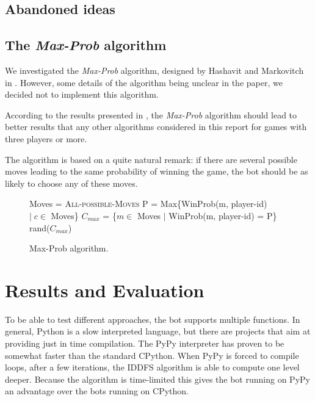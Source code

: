 \documentclass[a4paper,11pt]{article}
\begin{document}
\subsection{Abandoned ideas}
\subsection{The \textit{Max-Prob} algorithm}
We investigated the \textit{Max-Prob} algorithm, designed by Hashavit and
Markovitch in \cite{Hashavit}. However, some details of the algorithm being
unclear in the paper, we decided not to implement this algorithm.

According to the results presented in \cite{Hashavit}, the \textit{Max-Prob}
algorithm should lead to better results that any other algorithms considered
in this report for games with three players or more.

The algorithm is based on a quite natural remark: if there are several
possible moves leading to the same probability of winning the game, the bot
should be as likely to choose any of these moves.

\begin{figure}
\begin{algorithmic}
\State Moves = \textsc{All-possible-Moves}
\State P = Max\{WinProb(m, player-id) $| \; c \in$ Moves\}
\State $C_{max}$ = \{$m \in$ Moves $|$ WinProb(m, player-id) = P\}
\State \Return rand($C_{max}$)
\EndFunction
\end{algorithmic}
\caption{Max-Prob algorithm.}
\end{figure}

\section{Results and Evaluation}

To be able to test different approaches, the bot supports multiple
functions. In general, Python is a slow interpreted language, but
there are projects that aim at providing just in time compilation. The
PyPy interpreter has proven to be somewhat faster than the standard
CPython. When PyPy is forced to compile loops, after a few iterations,
the IDDFS algorithm is able to compute one level deeper. Because the
algorithm is time-limited this gives the bot running on PyPy an
advantage over the bots running on CPython.
\end{document}
